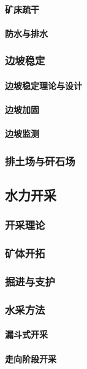 \documentclass[UTF8]{../../ApplicationUniverse}
\begin{document}
            \paragraph{矿床疏干}
            \paragraph{防水与排水}
        \subsubsection{边坡稳定}
            \paragraph{边坡稳定理论与设计}
            \paragraph{边坡加固}
            \paragraph{边坡监测}
        \subsubsection{排土场与矸石场}
    \subsection{水力开采}
        \subsubsection{开采理论}
        \subsubsection{矿体开拓}
        \subsubsection{掘进与支护}
        \subsubsection{水采方法}
            \paragraph{漏斗式开采}
            \paragraph{走向阶段开采}
\end{document}
